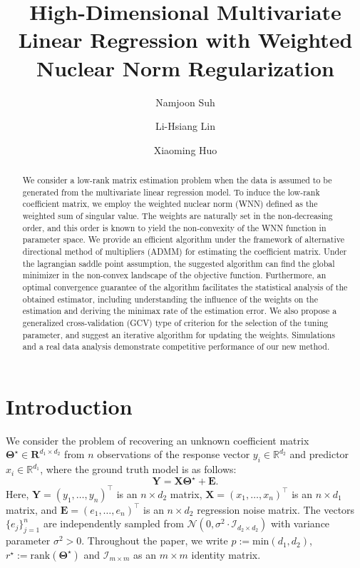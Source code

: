 \documentclass[alpha-refs]{wiley-article}
\title{High-Dimensional Multivariate Linear Regression with Weighted Nuclear Norm Regularization}
\author[1]{Namjoon Suh}
\author[2]{Li-Hsiang Lin}
\author[1]{Xiaoming Huo}
\affil[1]{H. Milton Stewart School of Industrial Systems and Engineering, Georgia Institute of Technology, Atlanta, Georgia, 30332, USA}
\affil[2]{Department of Experimental Statistics, Louisiana State University, Baton Rouge, Louisiana, 70803, USA}
\begin{document}
\maketitle

\begin{abstract}
We consider a low-rank matrix estimation problem when the data is assumed to be generated from the multivariate linear regression model. 
To induce the low-rank coefficient matrix, we employ the weighted nuclear norm (WNN) defined as the weighted sum of singular value. 
The weights are naturally set in the non-decreasing order, and this order is known to yield the non-convexity of the WNN function in parameter space.
We provide an efficient algorithm under the framework of alternative directional method of multipliers (ADMM) for estimating the coefficient matrix. 
Under the lagrangian saddle point assumption, the suggested algorithm can find the global minimizer in the non-convex landscape of the objective function.
Furthermore, an optimal convergence guarantee of the algorithm facilitates the statistical analysis of the obtained estimator, including understanding the influence of the weights on the estimation and deriving the minimax rate of the estimation error. We also propose a generalized cross-validation (GCV) type of criterion for the selection of the tuning parameter, and suggest an iterative algorithm for updating the weights.
Simulations and a real data analysis demonstrate competitive performance of our new method.

\end{abstract}

\section{Introduction}
We consider the problem of recovering an unknown coefficient matrix $\boldsymbol{\Theta^\star}\in \boldsymbol{R}^{d_{1} \times d_{2}}$ from $n$ observations of the response vector $y_{i} \in \mathbb{R}^{d_{2}}$ and predictor $x_{i}\in\mathbb{R}^{d_{1}}$, where the ground truth model is as follows:
\begin{equation}
    \boldsymbol{Y} = \boldsymbol{X}\boldsymbol{\Theta}^{\star} + \boldsymbol{E}. \label{MVR}
\end{equation}
Here, $\boldsymbol{Y}=(y_{1},\dots,y_{n})^{\top}$ is an $n \times d_{2}$ matrix, $\boldsymbol{X}=(x_{1},\dots,x_{n})^{\top}$ is an $n \times d_{1}$ matrix, and $\boldsymbol{E}=(e_{1},\dots,e_{n})^{\top}$ is an $n \times d_{2}$ regression noise matrix.
The vectors $\{e_{j}\}_{j=1}^{n}$ are independently sampled from $\mathcal{N}(0,\sigma^{2} \cdot \mathcal{I}_{d_{2}\times d_{2}})$ with variance parameter $\sigma^{2}>0$.
Throughout the paper, we write $p:=\text{min}(d_{1},d_{2})$, $r^{\star}:=\text{rank}(\boldsymbol{\Theta}^{\star})$ and $\mathcal{I}_{m \times m}$ as an $m \times m$ identity matrix.
\end{document}
